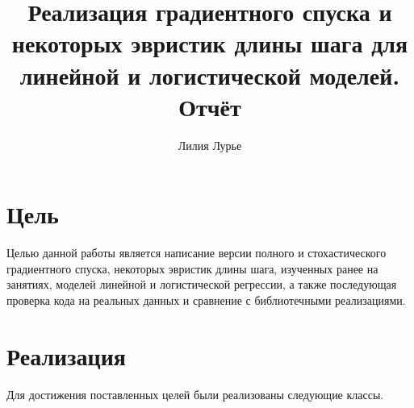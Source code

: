 \documentclass{article}
\title{Реализация градиентного спуска и некоторых эвристик длины шага для линейной и логистической моделей. Отчёт}
\author{Лилия Лурье}
\begin{document}
\maketitle

\section*{Цель}
Целью данной работы является написание версии полного и стохастического градиентного спуска, некоторых эвристик длины шага, изученных ранее на занятиях, моделей линейной и логистической регрессии, а также последующая проверка кода на реальных данных и сравнение с библиотечными реализациями.

\section*{Реализация}
Для достижения поставленных целей были реализованы следующие классы.
\end{document}
